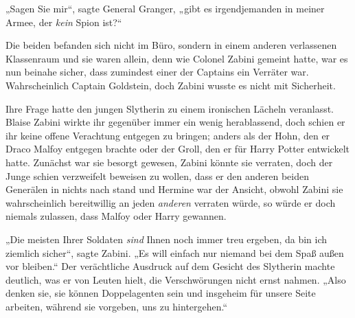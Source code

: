 „Sagen Sie mir“, sagte General Granger, „gibt es irgendjemanden in meiner Armee, der \emph{kein} Spion ist?“

Die beiden befanden sich nicht im Büro, sondern in einem anderen verlassenen Klassenraum und sie waren allein, denn wie Colonel Zabini gemeint hatte, war es nun beinahe sicher, dass zumindest einer der Captains ein Verräter war. Wahrscheinlich Captain Goldstein, doch Zabini wusste es nicht mit Sicherheit.

Ihre Frage hatte den jungen Slytherin zu einem ironischen Lächeln veranlasst. Blaise Zabini wirkte ihr gegenüber immer ein wenig herablassend, doch schien er ihr keine offene Verachtung entgegen zu bringen; anders als der Hohn, den er Draco Malfoy entgegen brachte oder der Groll, den er für Harry Potter entwickelt hatte. Zunächst war sie besorgt gewesen, Zabini könnte sie verraten, doch der Junge schien verzweifelt beweisen zu wollen, dass er den anderen beiden Generälen in nichts nach stand und Hermine war der Ansicht, obwohl Zabini sie wahrscheinlich bereitwillig an jeden \emph{anderen} verraten würde, so würde er doch niemals zulassen, dass Malfoy oder Harry gewannen.

„Die meisten Ihrer Soldaten \emph{sind} Ihnen noch immer treu ergeben, da bin ich ziemlich sicher“, sagte Zabini. „Es will einfach nur niemand bei dem Spaß außen vor bleiben.“ Der verächtliche Ausdruck auf dem Gesicht des Slytherin machte deutlich, was er von Leuten hielt, die Verschwörungen nicht ernst nahmen. „Also denken sie, sie können Doppelagenten sein und insgeheim für unsere Seite arbeiten, während sie vorgeben, uns zu hintergehen.“

